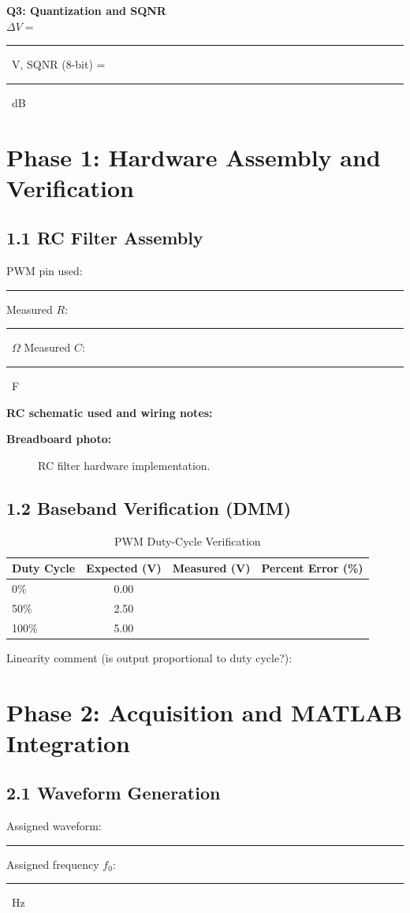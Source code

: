 \documentclass[11pt,letterpaper]{article}
\newcommand{\shortblank}{\rule{1.2in}{0.4pt}}
\newcommand{\answerbox}[1]{\fbox{\parbox[c][#1][t]{\linewidth}{}}}
\begin{document}
\textbf{Q3: Quantization and SQNR}\\
$\Delta V =$ \shortblank\ V, SQNR (8-bit) = \shortblank\ dB

\section{Phase 1: Hardware Assembly and Verification}
\subsection*{1.1 RC Filter Assembly}
PWM pin used: \shortblank \hfill Measured $R$: \shortblank\ $\Omega$ \hfill Measured $C$: \shortblank\ F

\textbf{RC schematic used and wiring notes:}
\answerbox{1.0in}

\textbf{Breadboard photo:}
\begin{figure}[H]
    \centering
    \caption{RC filter hardware implementation.}
\end{figure}

\subsection*{1.2 Baseband Verification (DMM)}
\begin{table}[H]
\centering
\caption{PWM Duty-Cycle Verification}
\begin{tabular}{@{}lccc@{}}
\toprule
Duty Cycle & Expected (V) & Measured (V) & Percent Error (\%) \\
\midrule
0\% & 0.00 & & \\
50\% & 2.50 & & \\
100\% & 5.00 & & \\
\bottomrule
\end{tabular}
\end{table}

Linearity comment (is output proportional to duty cycle?):
\answerbox{0.8in}

\section{Phase 2: Acquisition and MATLAB Integration}
\subsection*{2.1 Waveform Generation}
Assigned waveform: \shortblank\hfill Assigned frequency $f_0$: \shortblank\ Hz
\end{document}
